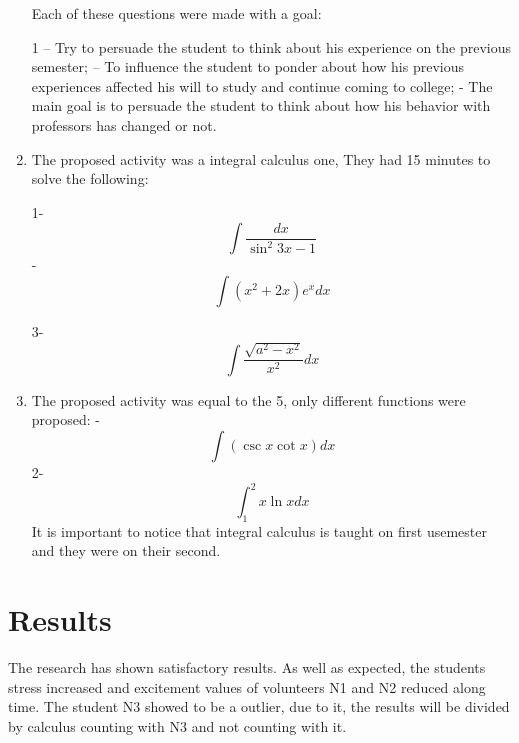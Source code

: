 \documentclass[12pt,openright,a4paper]{article}
\begin{document}
\begin{enumerate}
  Each of these questions were made with a goal:
  
  1 – Try to persuade the student to think about his experience on the previous semester; – To influence the student to ponder about how his previous experiences affected his will to study and continue coming to college; -  The main goal is to persuade the student to think about how his behavior with professors has changed or not.\newline
  
  \item The proposed activity was a integral calculus one, They had 15 minutes to solve the following:\newline
  
  		1- \[ \int\dfrac{dx}{\sin^2{3x - 1}} \]- \[ \int (x^2 + 2x)e^x dx \]
  		
  		3- \[ \int \dfrac{\sqrt{a^2 - x^2}}{x^2}dx \]
  		
   \item The proposed activity was equal to the 5, only different functions were proposed: - \[ \int (\csc x  \cot x) dx  \] 
        2- \[ \int_{1}^{2} x \ln x dx \]
  It is important to notice that integral calculus is taught on first usemester and they were on their second.
 \end{enumerate}
 
\section{Results}
 The research has shown satisfactory results. As well as expected, the students stress increased and excitement values of volunteers N1 and N2  reduced along time. The student N3 showed to be a outlier, due to it, the results will be divided by calculus counting with N3 and not counting with it.
 
\end{document}
